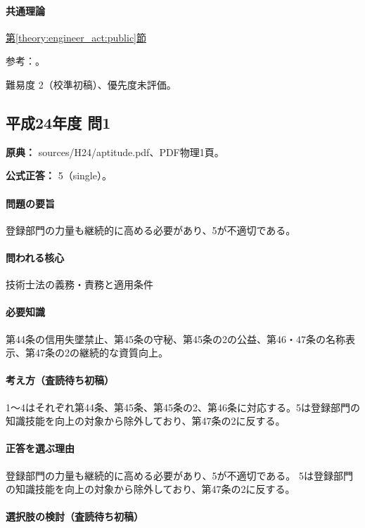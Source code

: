 \paragraph{共通理論} \hyperref[theory:engineer_act:public]{第\ref*{theory:engineer_act:public}節}

\par 参考：\cite{engineer_act_current,cpd_v3}。

\par 難易度 2（校準初稿）、優先度未評価。

\subsection{平成24年度 問1}
\label{q:h24-reg-apt-01}

\noindent\textbf{原典：} sources/H24/aptitude.pdf、PDF物理1頁。

\textbf{公式正答：} 5（single）。

\paragraph{問題の要旨} 登録部門の力量も継続的に高める必要があり、5が不適切である。

\paragraph{問われる核心} 技術士法の義務・責務と適用条件

\paragraph{必要知識} 第44条の信用失墜禁止、第45条の守秘、第45条の2の公益、第46・47条の名称表示、第47条の2の継続的な資質向上。

\paragraph{考え方（査読待ち初稿）} 1～4はそれぞれ第44条、第45条、第45条の2、第46条に対応する。5は登録部門の知識技能を向上の対象から除外しており、第47条の2に反する。

\paragraph{正答を選ぶ理由} 登録部門の力量も継続的に高める必要があり、5が不適切である。 5は登録部門の知識技能を向上の対象から除外しており、第47条の2に反する。

\paragraph{選択肢の検討（査読待ち初稿）}

